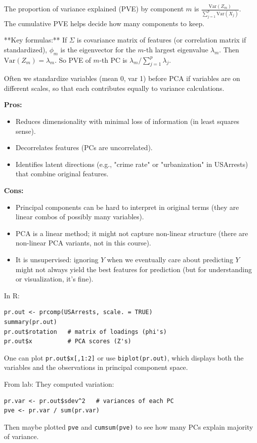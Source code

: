\documentclass[11pt]{article}
\begin{document}
The proportion of variance explained (PVE) by component $m$ is $\frac{\text{Var}(Z_m)}{\sum_{j=1}^p \text{Var}(X_j)}$. The cumulative PVE helps decide how many components to keep.

**Key formulas:**
If $\Sigma$ is covariance matrix of features (or correlation matrix if standardized), $\phi_m$ is the eigenvector for the $m$-th largest eigenvalue $\lambda_m$. Then $\text{Var}(Z_m) = \lambda_m$. So PVE of $m$-th PC is $\lambda_m/\sum_{j=1}^p \lambda_j$.

Often we standardize variables (mean 0, var 1) before PCA if variables are on different scales, so that each contributes equally to variance calculations.

\noindent \textbf{Pros:}
\begin{itemize}
    \item Reduces dimensionality with minimal loss of information (in least squares sense).
    \item Decorrelates features (PCs are uncorrelated).
    \item Identifies latent directions (e.g., "crime rate" or "urbanization" in USArrests) that combine original features.
\end{itemize}

\noindent \textbf{Cons:}
\begin{itemize}
    \item Principal components can be hard to interpret in original terms (they are linear combos of possibly many variables).
    \item PCA is a linear method; it might not capture non-linear structure (there are non-linear PCA variants, not in this course).
    \item It is unsupervised: ignoring $Y$ when we eventually care about predicting $Y$ might not always yield the best features for prediction (but for understanding or visualization, it's fine).
\end{itemize}

\noindent In R:
\begin{verbatim}
pr.out <- prcomp(USArrests, scale. = TRUE)
summary(pr.out)
pr.out$rotation   # matrix of loadings (phi's)
pr.out$x          # PCA scores (Z's)
\end{verbatim}
One can plot \texttt{pr.out\$x[,1:2]} or use \texttt{biplot(pr.out)}, which displays both the variables and the observations in principal component space.

From lab:
They computed variation:
\begin{verbatim}
pr.var <- pr.out$sdev^2   # variances of each PC
pve <- pr.var / sum(pr.var)
\end{verbatim}
Then maybe plotted \texttt{pve} and \texttt{cumsum(pve)} to see how many PCs explain majority of variance.
\end{document}
